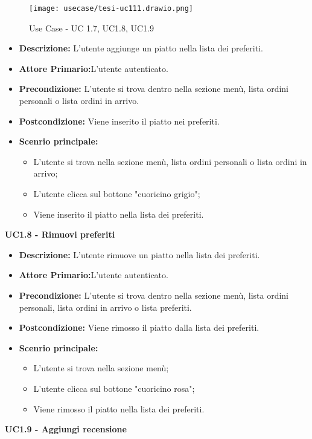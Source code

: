\begin{figure}[H]
    \centering
    \texttt{[image: usecase/tesi-uc111.drawio.png]}
    \caption{Use Case - UC 1.7, UC1.8, UC1.9}
\end{figure}
\begin{itemize}
    \item \textbf{Descrizione:} L'utente aggiunge un piatto nella lista dei preferiti.
    \item \textbf{Attore Primario:}L'utente autenticato.
    \item \textbf{Precondizione:} L'utente si trova dentro nella sezione menù, lista ordini personali o lista ordini in arrivo.
    \item \textbf{Postcondizione:} Viene inserito il piatto nei preferiti.
    \item \textbf{Scenrio principale:}
    \begin{itemize}
        \item L'utente si trova nella sezione menù, lista ordini personali o lista ordini in arrivo;
        \item L'utente clicca sul bottone "cuoricino grigio";
        \item Viene inserito il piatto nella lista dei preferiti.
    \end{itemize}
\end{itemize}
\textbf{UC1.8 - Rimuovi preferiti}
\begin{itemize}
    \item \textbf{Descrizione:} L'utente rimuove un piatto nella lista dei preferiti.
    \item \textbf{Attore Primario:}L'utente autenticato.
    \item \textbf{Precondizione:} L'utente si trova dentro nella sezione menù, lista ordini personali, lista ordini in arrivo o lista preferiti.
    \item \textbf{Postcondizione:} Viene rimosso il piatto dalla lista dei preferiti.
    \item \textbf{Scenrio principale:}
    \begin{itemize}
        \item L'utente si trova nella sezione menù;
        \item L'utente clicca sul bottone "cuoricino rosa";
        \item Viene rimosso il piatto nella lista dei preferiti.
    \end{itemize}
\end{itemize}
\textbf{UC1.9 - Aggiungi recensione}
